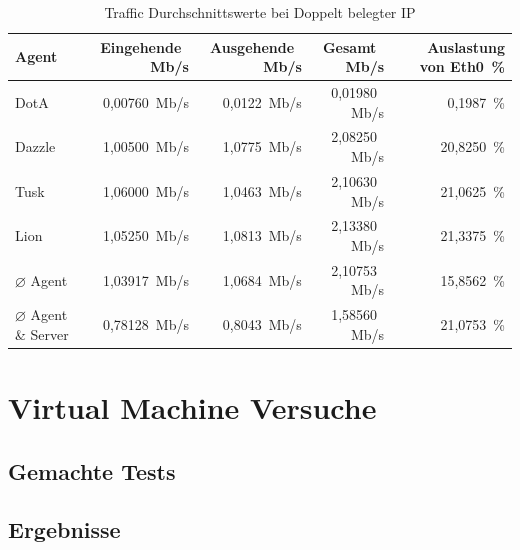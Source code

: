 \begin{table}
\centering
\begin{tabular}{l%
 r<{\,Mb/s}%
 r<{\,Mb/s}%
 r<{\,Mb/s}%
 r<{\,\%}%
}
Agent  				& Eingehende		& Ausgehende		& Gesamt		& Auslastung von Eth0	\\
\hline
DotA				& 0,00760		& 0,0122		& 0,01980		&  0,1987 		\\
Dazzle 				& 1,00500		& 1,0775		& 2,08250		& 20,8250		\\
Tusk 				& 1,06000		& 1,0463		& 2,10630		& 21,0625		\\
Lion				& 1,05250		& 1,0813		& 2,13380		& 21,3375		\\
$\diameter $ Agent 		& 1,03917 		& 1,0684 		& 2,10753		& 15,8562 		\\   
$\diameter $ Agent \& Server 	& 0,78128 		& 0,8043		& 1,58560		& 21,0753		\\

\end{tabular}
\caption{Traffic Durchschnittswerte bei Doppelt belegter IP}
\label{tab:DoppelteIPTraffic}
\end{table}


\section{Virtual Machine Versuche}
\label{sec:VMVersuche}
\subsection{Gemachte Tests}
\subsection{Ergebnisse}


